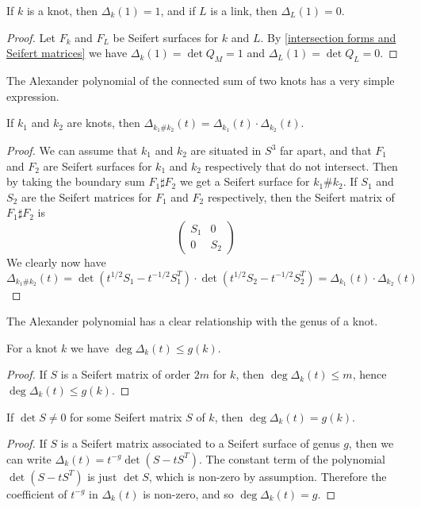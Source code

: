 \begin{cor}
If $k$ is a knot, then $\Delta_k(1)=1$, and if $L$ is a link, then $\Delta_L(1)=0$.
\end{cor}
\begin{proof}
Let $F_k$ and $F_L$ be Seifert surfaces for $k$ and $L$. By \cref{intersection forms and Seifert matrices} we have $\Delta_k(1)=\det Q_M=1$ and $\Delta_L(1)=\det Q_L = 0$.
\end{proof}

The Alexander polynomial of the connected sum of two knots has a very simple expression.
\begin{prop}
If $k_1$ and $k_2$ are knots, then $\Delta_{k_1 \# k_2}(t) = \Delta_{k_1}(t) \cdot \Delta_{k_2}(t)$.
\end{prop}
\begin{proof}
We can assume that $k_1$ and $k_2$ are situated in $S^3$ far apart, and that $F_1$ and $F_2$ are Seifert surfaces for $k_1$ and $k_2$ respectively that do not intersect. Then by taking the boundary sum $F_1 \sharp F_2$ we get a Seifert surface for $k_1 \# k_2$. If $S_1$ and $S_2$ are the Seifert matrices for $F_1$ and $F_2$ respectively, then the Seifert matrix of $F_1 \sharp F_2$ is
\[ \begin{pmatrix} S_1 & 0 \\ 0 & S_2 \end{pmatrix} \]
We clearly now have
\[ \Delta_{k_1\# k_2}(t) = \det(t^{1/2} S_1 - t^{-1/2} S_1^T) \cdot \det(t^{1/2} S_2 - t^{-1/2} S_2^T) = \Delta_{k_1}(t) \cdot \Delta_{k_2}(t) \]

\end{proof}



The Alexander polynomial has a clear relationship with the genus of a knot.
\begin{prop}
For a knot $k$ we have $\deg \Delta_k(t) \leq g(k)$.
\end{prop}
\begin{proof}
If $S$ is a Seifert matrix of order $2m$ for $k$, then $\deg \Delta_k(t) \leq m$, hence $\deg \Delta_k(t) \leq g(k)$.
\end{proof}

\begin{prop}
If $\det S \neq 0$ for some Seifert matrix $S$ of $k$, then $\deg \Delta_k(t) = g(k)$.
\end{prop}
\begin{proof}
If $S$ is a Seifert matrix associated to a Seifert surface of genus $g$, then we can write $\Delta_k(t) = t^{-g} \det(S-tS^T)$. The constant term of the polynomial $\det(S-tS^T)$ is just $\det S$, which is non-zero by assumption. Therefore the coefficient of $t^{-g}$ in $\Delta_k(t)$ is non-zero, and so $\deg \Delta_k(t) = g$.
\end{proof}





